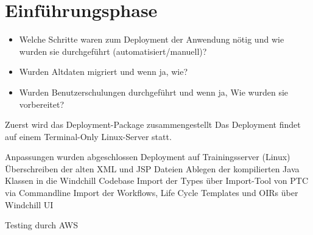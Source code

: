 \section{Einführungsphase} %
\label{sec:Einfuehrungsphase}

\begin{itemize}
	\item Welche Schritte waren zum Deployment der Anwendung nötig und wie wurden sie durchgeführt (automatisiert/manuell)?
	\item Wurden \ggfs Altdaten migriert und wenn ja, wie?
	\item Wurden Benutzerschulungen durchgeführt und wenn ja, Wie wurden sie vorbereitet?
\end{itemize}


Zuerst wird das Deployment-Package zusammengestellt
Das Deployment findet auf einem Terminal-Only Linux-Server statt.

Anpassungen wurden abgeschlossen
Deployment auf Trainingsserver (Linux)
	Überschreiben der alten XML und JSP Dateien
	Ablegen der kompilierten Java Klassen in die Windchill Codebase
	Import der Types über Import-Tool von PTC via Commandline
	Import der Workflows, Life Cycle Templates und OIRs über Windchill UI


Testing durch AWS

